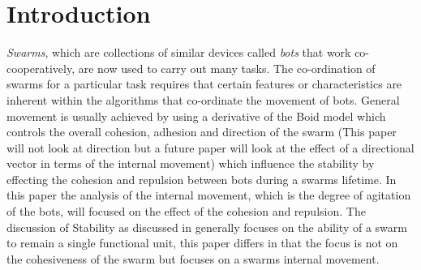 \documentclass[10pt,journal,letterpaper,twoside]{IEEEtran}
\newcommand{\stability}{internal movement}
\begin{document}
\maketitle


\IEEEdisplaynotcompsoctitleabstractindextext


%
\IEEEpeerreviewmaketitle

\section{Introduction\label{section:introduction}}

\emph{Swarms}, which are collections of similar devices called
\emph{bots} that work co-cooperatively, are now used to carry out many
tasks. The co-ordination of swarms for a particular task requires that
certain features or characteristics are inherent within the algorithms
that co-ordinate the movement of bots. General movement is usually
achieved by using a derivative of the Boid model \cite{CR87} which
controls the overall cohesion, adhesion and direction of the swarm
(This paper will not look at direction but a future paper will look at
the effect of a directional vector in terms of the \stability{}) which
influence the stability by effecting the cohesion and repulsion
between bots during a swarms lifetime. In this paper the analysis of
the \stability{}, which is the degree of agitation of the bots, will
focused on the effect of the cohesion and repulsion.  The discussion
of Stability as discussed in \cite{VGKP02} \cite{XCFPLLHF06} generally
focuses on the ability of a swarm to remain a single functional unit,
this paper differs in that the focus is not on the cohesiveness of the
swarm but focuses on a swarms \stability{}.
\end{document}
